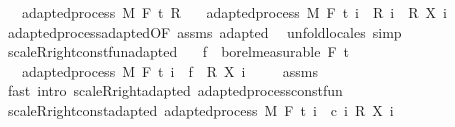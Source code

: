 \begin{isabellebody}
\ \ \ {\isachardoublequoteopen}adapted{\isacharunderscore}{\kern0pt}process\ M\ F\ t\ R{\isachardoublequoteclose}\isanewline
\ \ \ {\isachardoublequoteopen}adapted{\isacharunderscore}{\kern0pt}process\ M\ F\ t\ {\isacharparenleft}{\kern0pt}{\isasymlambda}i\ {\isasymxi}{\isachardot}{\kern0pt}\ {\isacharparenleft}{\kern0pt}R\ i\ {\isasymxi}{\isacharparenright}{\kern0pt}\ {\isacharasterisk}{\kern0pt}\isactrlsub R\ {\isacharparenleft}{\kern0pt}X\ i\ {\isasymxi}{\isacharparenright}{\kern0pt}{\isacharparenright}{\kern0pt}{\isachardoublequoteclose}\isanewline
%
\isadelimproof
\ \ %
\endisadelimproof
%
\isatagproof
{}\isamarkupfalse%
\ adapted{\isacharunderscore}{\kern0pt}process{\isachardot}{\kern0pt}adapted{\isacharbrackleft}{\kern0pt}OF\ assms{\isacharbrackright}{\kern0pt}\ adapted\ \isamarkupfalse%
\ {\isacharparenleft}{\kern0pt}unfold{\isacharunderscore}{\kern0pt}locales{\isacharparenright}{\kern0pt}\ simp%
\endisatagproof
{\isafoldproof}%
%
\isadelimproof
\isanewline
%
\endisadelimproof
\ \ \isanewline
{}\isamarkupfalse%
\ scaleR{\isacharunderscore}{\kern0pt}right{\isacharunderscore}{\kern0pt}const{\isacharunderscore}{\kern0pt}fun{\isacharunderscore}{\kern0pt}adapted{\isacharcolon}{\kern0pt}\isanewline
\ \ \ {\isachardoublequoteopen}f\ {\isasymin}\ borel{\isacharunderscore}{\kern0pt}measurable\ {\isacharparenleft}{\kern0pt}F\ t\ \isanewline
\ \ \ {\isachardoublequoteopen}adapted{\isacharunderscore}{\kern0pt}process\ M\ F\ t\ {\isacharparenleft}{\kern0pt}{\isasymlambda}i\ {\isasymxi}{\isachardot}{\kern0pt}\ f\ {\isasymxi}\ {\isacharasterisk}{\kern0pt}\isactrlsub R\ {\isacharparenleft}{\kern0pt}X\ i\ {\isasymxi}{\isacharparenright}{\kern0pt}{\isacharparenright}{\kern0pt}{\isachardoublequoteclose}\isanewline
%
\isadelimproof
\ \ %
\endisadelimproof
%
\isatagproof
{}\isamarkupfalse%
\ assms\ \isamarkupfalse%
\ {\isacharparenleft}{\kern0pt}fast\ intro{\isacharcolon}{\kern0pt}\ scaleR{\isacharunderscore}{\kern0pt}right{\isacharunderscore}{\kern0pt}adapted\ adapted{\isacharunderscore}{\kern0pt}process{\isacharunderscore}{\kern0pt}const{\isacharunderscore}{\kern0pt}fun{\isacharparenright}{\kern0pt}%
\endisatagproof
{\isafoldproof}%
%
\isadelimproof
\isanewline
%
\endisadelimproof
\isanewline
{}\isamarkupfalse%
\ scaleR{\isacharunderscore}{\kern0pt}right{\isacharunderscore}{\kern0pt}const{\isacharunderscore}{\kern0pt}adapted{\isacharcolon}{\kern0pt}\ {\isachardoublequoteopen}adapted{\isacharunderscore}{\kern0pt}process\ M\ F\ t\ {\isacharparenleft}{\kern0pt}{\isasymlambda}i\ {\isasymxi}{\isachardot}{\kern0pt}\ c\ i\ {\isacharasterisk}{\kern0pt}\isactrlsub R\ {\isacharparenleft}{\kern0pt}X\ i\ {\isasymxi}{\isacharparenright}{\kern0pt}{\isacharparenright}{\kern0pt}{\isachardoublequoteclose}%

\end{isabellebody}
